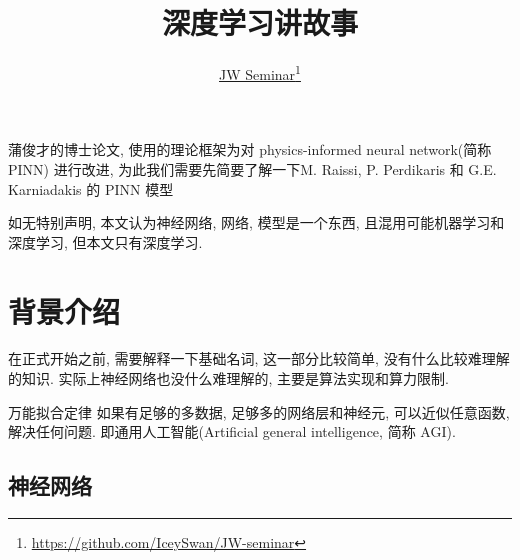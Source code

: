 \documentclass[lang=cn,a4paper,newtx]{elegantpaper}
\title{深度学习讲故事}
\author{\href{https://github.com/IceySwan/JW-seminar}{JW Seminar}\footnote{\href{https://github.com/IceySwan/JW-seminar}{https://github.com/IceySwan/JW-seminar}}}
\date{\zhtoday}
\begin{document}
\maketitle

蒲俊才的博士论文\cite{pu-thesis}, 使用的理论框架为对 physics-informed neural network(简称 PINN) 进行改进, 为此我们需要先简要了解一下M. Raissi, P. Perdikaris 和 G.E. Karniadakis 的 PINN 模型\cite{PINN}
\begin{remark}
    如无特别声明, 本文认为神经网络, 网络, 模型是一个东西, 且混用可能机器学习和深度学习, 但本文只有深度学习. 
\end{remark}

\section{背景介绍}
在正式开始之前, 需要解释一下基础名词, 这一部分比较简单, 没有什么比较难理解的知识. 实际上神经网络也没什么难理解的, 主要是算法实现和算力限制. 
\begin{definition}{万能拟合定律}
    如果有足够的多数据, 足够多的网络层和神经元, 可以近似任意函数, 解决任何问题. 即通用人工智能(Artificial general intelligence, 简称 AGI). 
\end{definition}

\subsection{神经网络}
\end{document}
